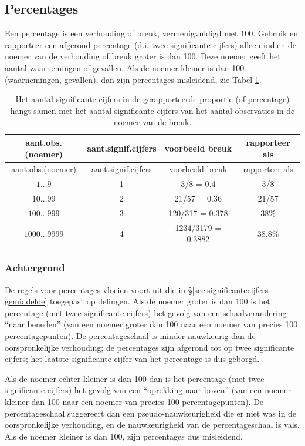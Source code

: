 \documentclass[
]{book}
\begin{document}
\hypertarget{percentages}{%
\subsection{Percentages}\label{percentages}}

Een percentage is een verhouding of breuk, vermenigvuldigd met \(100\).
Gebruik en rapporteer een afgerond percentage (d.i. twee significante
cijfers) alleen indien de noemer van de verhouding of breuk groter is
dan 100. Deze noemer geeft het aantal waarnemingen of gevallen. Als de
noemer kleiner is dan 100 (waarnemingen, gevallen), dan zijn percentages
misleidend, zie Tabel \ref{tab:signifcijferspercentage}.

\begin{longtable}[]{@{}cccc@{}}
\caption{\label{tab:signifcijferspercentage} Het aantal significante cijfers in de gerapporteerde proportie (of percentage) hangt samen met het aantal significante cijfers van het aantal observaties in de noemer van de breuk.}\tabularnewline
\toprule
aant.obs.(noemer) & aant.signif.cijfers & voorbeeld breuk & rapporteer als\tabularnewline
\midrule
\endfirsthead
\toprule
aant.obs.(noemer) & aant.signif.cijfers & voorbeeld breuk & rapporteer als\tabularnewline
\midrule
\endhead
\(1\dots9\) & 1 & 3/8 = 0.4 & 3/8\tabularnewline
\(10\dots99\) & 2 & 21/57 = 0.36 & 21/57\tabularnewline
\(100\dots999\) & 3 & 120/317 = 0.378 & 38\%\tabularnewline
\(1000\dots9999\) & 4 & 1234/3179 = 0.3882 & 38.8\%\tabularnewline
\bottomrule
\end{longtable}

\hypertarget{achtergrond-1}{%
\subsubsection{Achtergrond}\label{achtergrond-1}}

De regels voor percentages vloeien voort uit die in
§\ref{sec:significantecijfers-gemiddelde} toegepast op delingen.
Als de noemer groter is dan 100 is het percentage (met twee significante
cijfers) het gevolg van een schaalverandering ``naar beneden'' (van een
noemer groter dan 100 naar een noemer van precies 100 percentagepunten).
De percentageschaal is minder nauwkeurig dan de oorspronkelijke
verhouding; de percentages zijn afgerond tot op twee significante
cijfers; het laatste significante cijfer van het percentage is dus
geborgd.

Als de noemer echter kleiner is dan 100 dan is het percentage (met twee
significante cijfers) het gevolg van een ``oprekking naar boven'' (van een
noemer kleiner dan 100 naar een noemer van precies 100
percentagepunten). De percentageschaal suggereert dan een
pseudo-nauwkeurigheid die er niet was in de oorspronkelijke verhouding,
en de nauwkeurigheid van de percentageschaal is vals. Als de noemer
kleiner is dan 100, zijn percentages dus misleidend.
\end{document}
